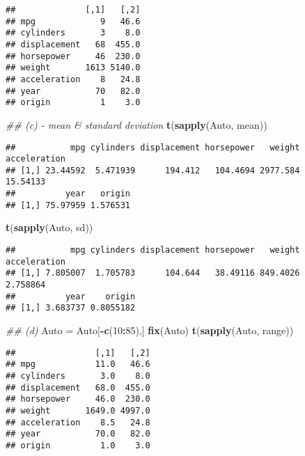 \documentclass[]{article}
\newenvironment{Shaded}{\begin{snugshade}}{\end{snugshade}}
\newcommand{\CommentTok}[1]{\textcolor[rgb]{0.56,0.35,0.01}{\textit{#1}}}
\newcommand{\DecValTok}[1]{\textcolor[rgb]{0.00,0.00,0.81}{#1}}
\newcommand{\KeywordTok}[1]{\textcolor[rgb]{0.13,0.29,0.53}{\textbf{#1}}}
\newcommand{\NormalTok}[1]{#1}
\newcommand{\OperatorTok}[1]{\textcolor[rgb]{0.81,0.36,0.00}{\textbf{#1}}}
\newcommand{\StringTok}[1]{\textcolor[rgb]{0.31,0.60,0.02}{#1}}
\begin{document}
\begin{verbatim}
##              [,1]   [,2]
## mpg             9   46.6
## cylinders       3    8.0
## displacement   68  455.0
## horsepower     46  230.0
## weight       1613 5140.0
## acceleration    8   24.8
## year           70   82.0
## origin          1    3.0
\end{verbatim}

\begin{Shaded}
\begin{Highlighting}[]
\CommentTok{## (c) - mean & standard deviation}
\KeywordTok{t}\NormalTok{(}\KeywordTok{sapply}\NormalTok{(Auto, mean))}
\end{Highlighting}
\end{Shaded}

\begin{verbatim}
##           mpg cylinders displacement horsepower   weight acceleration
## [1,] 23.44592  5.471939      194.412   104.4694 2977.584     15.54133
##          year   origin
## [1,] 75.97959 1.576531
\end{verbatim}

\begin{Shaded}
\begin{Highlighting}[]
\KeywordTok{t}\NormalTok{(}\KeywordTok{sapply}\NormalTok{(Auto, sd))}
\end{Highlighting}
\end{Shaded}

\begin{verbatim}
##           mpg cylinders displacement horsepower   weight acceleration
## [1,] 7.805007  1.705783      104.644   38.49116 849.4026     2.758864
##          year    origin
## [1,] 3.683737 0.8055182
\end{verbatim}

\begin{Shaded}
\begin{Highlighting}[]
\CommentTok{## (d)}
\NormalTok{Auto =}\StringTok{ }\NormalTok{Auto[}\OperatorTok{-}\KeywordTok{c}\NormalTok{(}\DecValTok{10}\OperatorTok{:}\DecValTok{85}\NormalTok{),]}
\KeywordTok{fix}\NormalTok{(Auto)}
\KeywordTok{t}\NormalTok{(}\KeywordTok{sapply}\NormalTok{(Auto, range))}
\end{Highlighting}
\end{Shaded}

\begin{verbatim}
##                [,1]   [,2]
## mpg            11.0   46.6
## cylinders       3.0    8.0
## displacement   68.0  455.0
## horsepower     46.0  230.0
## weight       1649.0 4997.0
## acceleration    8.5   24.8
## year           70.0   82.0
## origin          1.0    3.0
\end{verbatim}
\end{document}

